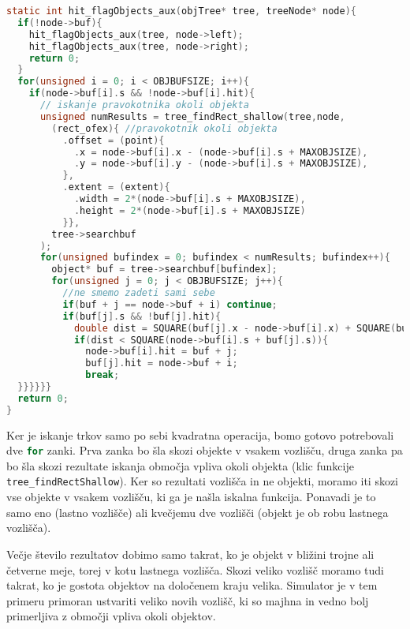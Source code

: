 \documentclass[a4paper,12pt]{article}
\begin{document}
\begin{lstlisting}[float, breaklines=true, postbreak=\mbox{\textcolor{purple}{$\hookrightarrow$}\space}, caption={Zaznava trkov}, label=hit_detect, language=C]
static int hit_flagObjects_aux(objTree* tree, treeNode* node){
  if(!node->buf){
    hit_flagObjects_aux(tree, node->left);
    hit_flagObjects_aux(tree, node->right);
    return 0;
  }
  for(unsigned i = 0; i < OBJBUFSIZE; i++){
    if(node->buf[i].s && !node->buf[i].hit){      
      // iskanje pravokotnika okoli objekta
      unsigned numResults = tree_findRect_shallow(tree,node,
        (rect_ofex){ //pravokotnik okoli objekta
          .offset = (point){
            .x = node->buf[i].x - (node->buf[i].s + MAXOBJSIZE),
            .y = node->buf[i].y - (node->buf[i].s + MAXOBJSIZE),
          },
          .extent = (extent){
            .width = 2*(node->buf[i].s + MAXOBJSIZE),
            .height = 2*(node->buf[i].s + MAXOBJSIZE)
          }},
        tree->searchbuf
      );
      for(unsigned bufindex = 0; bufindex < numResults; bufindex++){
        object* buf = tree->searchbuf[bufindex];
        for(unsigned j = 0; j < OBJBUFSIZE; j++){
          //ne smemo zadeti sami sebe
          if(buf + j == node->buf + i) continue; 
          if(buf[j].s && !buf[j].hit){
            double dist = SQUARE(buf[j].x - node->buf[i].x) + SQUARE(buf[j].y - node->buf[i].y);            
            if(dist < SQUARE(node->buf[i].s + buf[j].s)){
              node->buf[i].hit = buf + j;
              buf[j].hit = node->buf + i;
              break;
  }}}}}}
  return 0;
}
\end{lstlisting}
Ker je iskanje trkov samo po sebi kvadratna operacija, bomo gotovo potrebovali dve \lstinline[language=C]|for| zanki.
Prva zanka bo šla skozi objekte v vsakem vozlišču, druga zanka pa bo šla skozi rezultate iskanja območja vpliva okoli
objekta (klic funkcije \lstinline|tree_findRectShallow|). Ker so rezultati vozlišča in ne objekti, moramo iti skozi vse
objekte v vsakem vozlišču, ki ga je našla iskalna funkcija. Ponavadi je to samo eno (lastno vozlišče) ali kvečjemu dve
vozlišči (objekt je ob robu lastnega vozlišča).

Večje število rezultatov dobimo samo takrat, ko je objekt v bližini trojne ali četverne meje,
torej v kotu lastnega vozlišča. Skozi veliko vozlišč moramo tudi takrat, ko je gostota 
objektov na določenem kraju velika. Simulator je v tem primeru primoran ustvariti veliko novih vozlišč, ki so 
majhna in vedno bolj primerljiva z območji vpliva okoli objektov.
\end{document}
